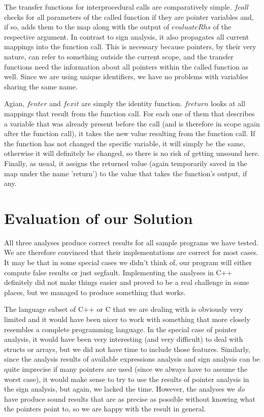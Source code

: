 \documentclass[a4paper,11pt]{article}
\begin{document}
The transfer functions for interprocedural calls are comparatively simple. $fcall$ checks for all parameters of the called function if they are pointer variables and, if so, adds them to the map along with the output of $evaluateRhs$ of the respective argument. In contrast to sign analysis, it also propagates all current mappings into the function call. This is necessary because pointers, by their very nature, can refer to something outside the current scope, and the transfer functions need the information about all pointers within the called function as well. Since we are using unique identifiers, we have no problems with variables sharing the same name. 

Agian, $fenter$ and $fexit$ are simply the identity function. $freturn$ looks at all mappings that result from the function call. For each one of them that describes a variable that was already present before the call (and is therefore in scope again after the function call), it takes the new value resulting from the function call. If the function has not changed the specific variable, it will simply be the same, otherwise it will definitely be changed, so there is no risk of getting unsound here. Finally, as usual, it assigns the returned value (again temporarily saved in the map under the name 'return') to the value that takes the function's output, if any. 

\section{Evaluation of our Solution}
All three analyses produce correct results for all sample programs we have tested. We are therefore convinced that their implementations are correct for most cases. It may be that in some special cases we didn't think of, our program will either compute false results or just segfault. Implementing the analyses in C++ definitely did not make things easier and proved to be a real challenge in some places, but we managed to produce something that works.

The language subset of C++ or C that we are dealing with is obviously very limited and it would have been nicer to work with something that more closely resembles a complete programming language. In the special case of pointer analysis, it would have been very interesting (and very difficult) to deal with structs or arrays, but we did not have time to include those features. Similarly, since the analysis results of available expressions analysis and sign analysis can be quite imprecise if many pointers are used (since we always have to assume the worst case), it would make sense to try to use the results of pointer analysis in the sign analysis, but again, we lacked the time. However, the analyses we \emph{do} have produce sound results that are as precise as possible without knowing what the pointers point to, so we are happy with the result in general.
\end{document}
